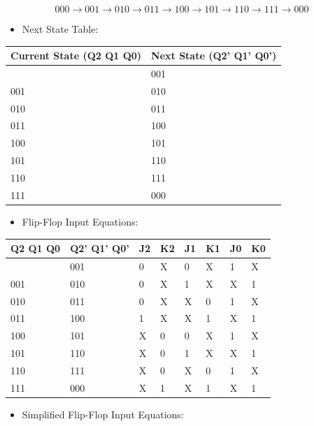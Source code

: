 \documentclass[11pt,a4paper]{article}
\providecommand{\tightlist}{\setlength{\itemsep}{1pt}\setlength{\parskip}{0pt}}
\begin{document}
\[
000 \rightarrow 001 \rightarrow 010 \rightarrow 011 \rightarrow 100 \rightarrow 101 \rightarrow 110 \rightarrow 111 \rightarrow 000
\]

\begin{itemize}
\tightlist
\item
  Next State Table:
\end{itemize}

\begin{longtable}[]{@{}ll@{}}
\toprule\noalign{}
Current State (Q2 Q1 Q0) & Next State (Q2' Q1' Q0') \\
\midrule\noalign{}
\endhead
\bottomrule\noalign{}
\endlastfoot
000 & 001 \\
001 & 010 \\
010 & 011 \\
011 & 100 \\
100 & 101 \\
101 & 110 \\
110 & 111 \\
111 & 000 \\
\end{longtable}

\begin{itemize}
\tightlist
\item
  Flip-Flop Input Equations:
\end{itemize}

\begin{longtable}[]{@{}llllllll@{}}
\toprule\noalign{}
Q2 Q1 Q0 & Q2' Q1' Q0' & J2 & K2 & J1 & K1 & J0 & K0 \\
\midrule\noalign{}
\endhead
\bottomrule\noalign{}
\endlastfoot
000 & 001 & 0 & X & 0 & X & 1 & X \\
001 & 010 & 0 & X & 1 & X & X & 1 \\
010 & 011 & 0 & X & X & 0 & 1 & X \\
011 & 100 & 1 & X & X & 1 & X & 1 \\
100 & 101 & X & 0 & 0 & X & 1 & X \\
101 & 110 & X & 0 & 1 & X & X & 1 \\
110 & 111 & X & 0 & X & 0 & 1 & X \\
111 & 000 & X & 1 & X & 1 & X & 1 \\
\end{longtable}

\begin{itemize}
\tightlist
\item
  Simplified Flip-Flop Input Equations:
\end{itemize}
\end{document}
